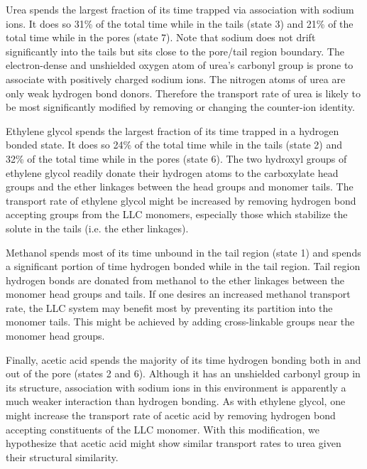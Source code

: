 \documentclass[aps,pre,preprint,groupedaddress,longbibliography]{revtex4-2}
\begin{document}
  Urea spends the largest fraction of its time trapped via association with sodium ions.
  It does so 31\% of the total time while in the tails (state 3) and 21\% of the
  total time while in the pores (state 7). Note that sodium does not drift significantly 
  into the tails but sits close to the pore/tail region boundary. The electron-dense 
  and unshielded oxygen atom of urea's carbonyl group is prone to associate with 
  positively charged sodium ions. The nitrogen atoms of urea are only weak hydrogen bond
  donors. 
  Therefore the transport rate of urea 
  is likely to be most significantly modified
  by removing or changing 
  the counter-ion identity.
  
  Ethylene glycol spends the largest fraction of its time trapped in a hydrogen
  bonded state. It does so 24\% of the total time while in the tails (state 2)
  and 32\% of the total time while in the pores (state 6). The two hydroxyl groups 
  of ethylene glycol readily donate their hydrogen atoms to the carboxylate
  head groups and the ether linkages between the head groups and monomer tails.
  The transport rate of ethylene glycol might be increased by removing hydrogen 
  bond accepting groups from the LLC monomers, especially those which stabilize
  the solute in the tails (i.e. the ether linkages). 
  
  Methanol spends most of its time unbound in the tail region (state 1) and spends a 
  significant portion of time hydrogen bonded while in the tail region.
  Tail region hydrogen bonds are donated from methanol to the ether linkages between
  the monomer head groups and tails. 
  If one desires an increased methanol transport 
  rate, the LLC system may benefit most by preventing its partition into the monomer
  tails. This might be achieved by adding cross-linkable groups near the monomer
  head groups.
  
  Finally, acetic acid spends the majority of its time hydrogen bonding both in and out
  of the pore (states 2 and 6). Although it has an unshielded carbonyl group in its
  structure, association with sodium ions in this environment is apparently a much 
  weaker interaction than hydrogen bonding. 
  As with ethylene glycol, one might increase
  the transport rate of acetic acid by removing hydrogen bond accepting constituents
  of the LLC monomer. With this modification, we hypothesize that acetic acid 
  might 
  show similar transport rates to urea given their structural similarity.
  
\end{document}
